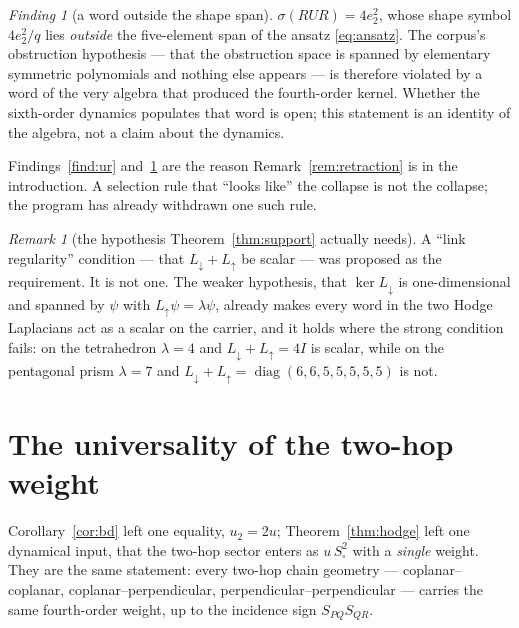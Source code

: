 \documentclass[11pt]{article}
\theoremstyle{definition}
\theoremstyle{remark}
\newtheorem{remark}[theorem]{Remark}
\newtheorem{finding}[theorem]{Finding}
\newcommand{\Ldn}{L_{\downarrow}}
\newcommand{\Lup}{L_{\uparrow}}
\newcommand{\Ssq}{S_{\square}}
\newcommand{\chk}[1]{}
\begin{document}
\begin{finding}[a word outside the shape span]\label{find:rur}
$\sigma(RUR)=4e_2^2$, whose shape symbol $4e_2^2/q$ lies \emph{outside} the
five-element span of the ansatz \eqref{eq:ansatz}. The corpus's obstruction
hypothesis --- that the obstruction space is spanned by elementary symmetric
polynomials and nothing else appears --- is therefore violated by a word of the
very algebra that produced the fourth-order kernel. Whether the sixth-order
dynamics populates that word is open; this statement is an identity of the
algebra, not a claim about the dynamics.\chk{FINDING: the algebra contains a shape monomial the four-shape ansatz cannot hold}
\end{finding}

Findings~\ref{find:ur} and~\ref{find:rur} are the reason
Remark~\ref{rem:retraction} is in the introduction. A selection rule that
``looks like'' the collapse is not the collapse; the program has already
withdrawn one such rule.

\begin{remark}[the hypothesis Theorem~\ref{thm:support} actually needs]
A ``link regularity'' condition --- that $\Ldn+\Lup$ be scalar --- was proposed
as the requirement. It is not one. The weaker hypothesis, that $\ker\Ldn$ is
one-dimensional and spanned by $\psi$ with $\Lup\psi=\lambda\psi$, already makes
every word in the two Hodge Laplacians act as a scalar on the carrier, and it
holds where the strong condition fails: on the tetrahedron $\lambda=4$ and
$\Ldn+\Lup=4I$ is scalar, while on the pentagonal prism $\lambda=7$ and
$\Ldn+\Lup=\operatorname{diag}(6,6,5,5,5,5,5)$ is not.\chk{the Hodge-word statement needs only L\_down psi = 0 and L\_up psi = lambda psi, and both hold in three geometries}
\end{remark}

\section{The universality of the two-hop weight}\label{sec:univ}

Corollary~\ref{cor:bd} left one equality, $u_2=2u$; Theorem~\ref{thm:hodge}
left one dynamical input, that the two-hop sector enters as $u\,\Ssq^2$ with a
\emph{single} weight. They are the same statement: every two-hop chain
geometry --- coplanar--coplanar, coplanar--perpendicular,
perpendicular--perpendicular --- carries the same fourth-order weight, up to
the incidence sign $S_{PQ}S_{QR}$.
\end{document}
